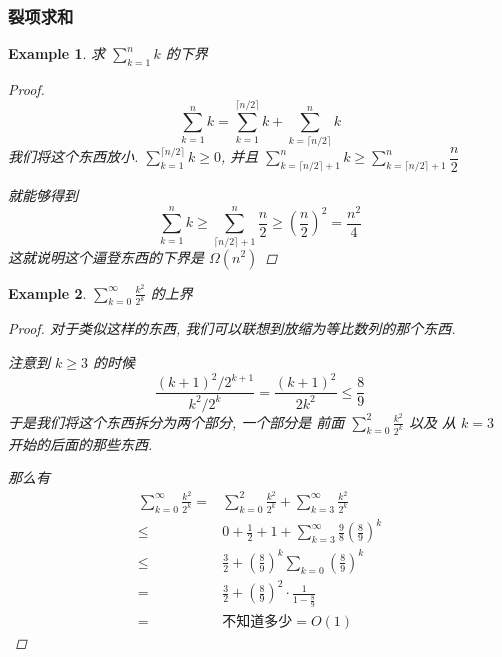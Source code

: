\documentclass[a4paper, 10pt]{ctexart} %
\newtheorem{example}{Example}
\begin{document}
\subsubsection{裂项求和}
\begin{example}
    求 $\sum_{k=1} ^{n} k   $ 的下界 
    \begin{proof}
        \[
        \sum_{ k=1}  ^{n} k = \sum^{\lceil n /2\rceil } _{k=1}k + \sum_{k = \lceil n / 2\rceil} ^{n} k
        \]
        我们将这个东西放小. 
        $\displaystyle \sum_{k=1}^{\lceil n / 2 \rceil} k \ge 0 $, 并且 $\displaystyle \sum_{k= \lceil n / 2 \rceil + 1} ^{n} k \ge  \sum_{k= \lceil n / 2 \rceil + 1} ^{n} \dfrac{n}{2} $

        就能够得到 
        \[
        \sum_{k=1} ^{n} k \ge \sum_{\lceil n / 2 \rceil  +1 }^{n} \frac{n}{2} \ge \left( \frac{n}{2}\right)   ^{2}  = \frac{n^{2}}{4}
        \] 这就说明这个逼登东西的下界是 $\Omega \left(n ^{2}\right)$
    \end{proof}
\end{example}
\begin{example}
    $\sum_{k=0} ^{\infty} \frac{k^{2} }{2^{k}}$ 的上界
    \begin{proof}
        对于类似这样的东西, 我们可以联想到放缩为等比数列的那个东西. 
        
        注意到 $k \ge 3$ 的时候 
        \[
        \frac{ \left(k  +1\right) ^{2}  /  2 ^{k+1}}{ k ^{2} / 2 ^{k}}  =  
        \frac{ \left(k+1\right) ^{2} }{ 2 k^{2}} \le
        \frac{8}{9}
        \]
        于是我们将这个东西拆分为两个部分, 一个部分是 前面 $\sum_{k=0} ^{2}         \displaystyle \frac{k^{2} }{ 2 ^{k} }$ 以及 
        从 $k  =3$ 开始的后面的那些东西. 
        
        那么有 
        \begin{align*}
        \sum_{ k=0} ^{\infty} \frac{k^{2} }{2 ^{k}}  =& \sum_{k  = 0}  ^{2} \frac{k^{2} }{ 2 ^{k} } + \sum_{ k=3}  ^{\infty} \frac{k^{2} }{2^{k} } \\
        \le& 0 + \frac{1}{2} + 1   +  \sum_{k=3}  ^{\infty} \frac{9}{8} \left( \frac{8}{9}\right) ^{k}   \\
        \le& \frac{3}{2}  + \left( \frac{8}{9}\right) ^{k}\sum_{k = 0} \left( \frac{8}{9}\right) ^{k} \\
        =& \frac{3}{2} + \left( \frac{8}{9}\right) ^{2} \cdot  \frac{1}{1-  \frac{8}{9}}  \\
        =& \text{不知道多少} = O\left(1\right)
        \end{align*}
    \end{proof}
\end{example}
\end{document}
